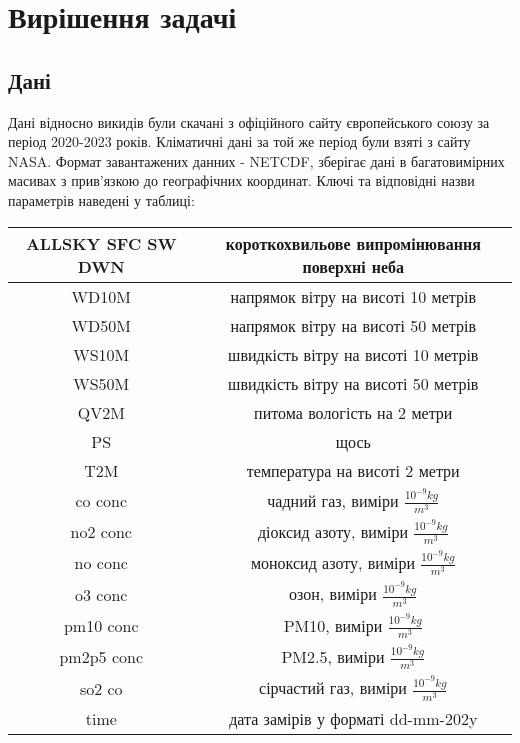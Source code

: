 \chapter{Вирішення задачі}

\section{Дані}

Дані відносно викидів були скачані з офіційного сайту європейського союзу за період 2020-2023 років.
Кліматичні дані за той же період були взяті з сайту NASA. 
Формат завантажених данних - NETCDF, зберігає дані в багатовимірних масивах з прив'язкою до географічних координат.
Ключі та відповідні назви параметрів наведені у таблиці:


\begin{center}
    \begin{tabular}{|c | c|}
        \hline
        ALLSKY SFC SW DWN & короткохвильове випромінювання поверхні неба \\
        \hline
        WD10M & напрямок вітру на висоті 10 метрів \\ 
        \hline
        WD50M & напрямок вітру на висоті 50 метрів \\
        \hline
        WS10M & швидкість вітру на висоті 10 метрів \\
        \hline
        WS50M & швидкість вітру на висоті 50 метрів  \\
        \hline
        QV2M & питома вологість на 2 метри \\
        \hline
        PS & щось \\
        \hline
        T2M & температура на висоті 2 метри \\
        \hline
        co conc & чадний газ, виміри $\frac{10^{-9}kg}{m^{3}}$ \\
        \hline
        no2 conc & діоксид азоту, виміри $\frac{10^{-9}kg}{m^{3}}$ \\
        \hline
        no conc & моноксид азоту, виміри $\frac{10^{-9}kg}{m^{3}}$ \\
        \hline
        o3 conc & озон, виміри $\frac{10^{-9}kg}{m^{3}}$  \\
        \hline
        pm10 conc & PM10, виміри $\frac{10^{-9}kg}{m^{3}}$ \\
        \hline
        pm2p5 conc & PM2.5, виміри $\frac{10^{-9}kg}{m^{3}}$ \\
        \hline
        so2 co & сірчастий газ, виміри $\frac{10^{-9}kg}{m^{3}}$ \\
        \hline
        time & дата замірів у форматі dd-mm-202y \\
        \hline
    \end{tabular}
    
    \vspace{1cm}
\end{center}




